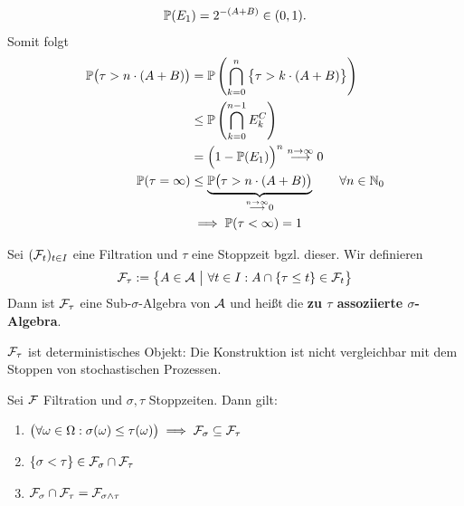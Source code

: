 \begin{beisp}
	\begin{align*}
		\P(E_1)=2^{-(A+B)}\in(0,1).
	\end{align*}
	Somit folgt
	\begin{align*}
		\P\big(\tau>n\cdot(A+B)\big)&=\P\left(\bigcap\limits_{k=0}^n\big\lbrace\tau > k\cdot (A+B)\big\rbrace\right)\\
		&\leq\P\left(\bigcap\limits_{k=0}^{n-1} E_k^C\right)\\
		&=\Big(1-\P(E_1)\Big)^n\stackrel{n\to\infty}{\longrightarrow}0\\
		\P(\tau=\infty)&\leq\underbrace{\P\big(\tau> n\cdot(A+B)\big)}_{\stackrel{n\to\infty}{\longrightarrow}0}\qquad\forall n\in\N_0\\
		&\implies
		\P(\tau<\infty)=1
	\end{align*}
\end{beisp}

\begin{defi}
	Sei $(\F_t)_{t\in I}$ eine Filtration und $\tau$ eine Stoppzeit bgzl. dieser. Wir definieren 
	\begin{align*}
		\F_\tau:=\big\lbrace A\in\A~\big|~\forall t\in I:A\cap\lbrace\tau\leq t\rbrace\in\F_t\big\rbrace
	\end{align*}
	Dann ist $\F_\tau$ eine Sub-$\sigma$-Algebra von $\A$ und heißt die \textbf{zu $\tau$ assoziierte $\sigma$-Algebra}.
\end{defi}

\begin{bemerkung}
	$\F_\tau$ ist deterministisches Objekt: Die Konstruktion ist nicht vergleichbar mit dem Stoppen von stochastischen Prozessen.
\end{bemerkung}

\setcounter{satz}{2} %
\begin{lemma}\label{lemma3.3}
	Sei $\F$ Filtration und $\sigma,\tau$ Stoppzeiten. Dann gilt:
	\begin{enumerate}[label=(\alph*)]
		\item $\begin{aligned}
			\big(\forall\omega\in\Omega:\sigma(\omega)\leq\tau(\omega)\big)\implies\F_\sigma\subseteq\F_\tau
		\end{aligned}$
		\item $\begin{aligned}
			\lbrace\sigma<\tau\rbrace\in\F_\sigma\cap\F_\tau
		\end{aligned}$
		\item $\begin{aligned}
			\F_\sigma\cap\F_\tau=\F_{\sigma\wedge\tau}
		\end{aligned}$
	\end{enumerate}
\end{lemma}

